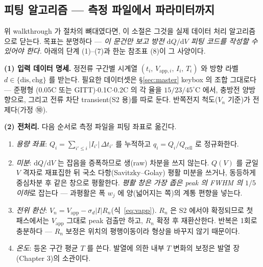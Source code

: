 \documentclass[11pt,a4paper]{article}
\newcommand{\dd}{\mathrm{d}}
\newcommand{\app}{\mathrm{app}}
\newcommand{\cell}{\mathrm{cell}}
\newcommand{\dis}{\mathrm{dis}}
\newcommand{\chg}{\mathrm{chg}}
\begin{document}
\subsection{피팅 알고리즘 — 측정 파일에서 파라미터까지}
위 walkthrough 가 절차의 뼈대였다면, 이 소절은 그것을 실제 데이터 처리 알고리즘으로 닫는다. 목표는 분명하다 —
\emph{이 문건만 보고 방전 $\dd Q/\dd V$ 피팅 코드를 작성할 수 있어야 한다.} 아래의 단계 (1)--(7)과 한눈 참조표 (8)이 그 사양이다.

\textbf{(1) 입력 데이터 명세.} 정전류 구간별 시계열 $(t_i,\,V_{\app,i},\,I_i,\,T_i)$ 와 방향 라벨
$d\in\{\dis,\chg\}$ 를 받는다. 필요한 데이터셋은 \S\ref{sec:master} keybox 의 조합 그대로다 — 준평형
(0.05C 또는 GITT)$\cdot$0.1C$\cdot$0.2C 의 각 율을 $15/23/45^\circ$C 에서, 충방전 양방향으로, 그리고 전류 차단
transient(S2 용)를 따로 둔다. 반쪽전지 척도($V_n$ 기준)가 전제다(가정 ⑩).

\textbf{(2) 전처리.} 다음 순서로 측정 파일을 피팅 좌표로 옮긴다.
\begin{enumerate}[label=(\roman*),leftmargin=2.0em,itemsep=1pt]
\item \emph{용량 좌표}: $Q_i=\sum_{i'\le i}|I_{i'}|\,\Delta t_{i'}$ 를 누적하고 $q_i=Q_i/Q_\cell$ 로 정규화한다.
\item \emph{미분}: $\dd Q/\dd V$ 는 잡음을 증폭하므로 생(raw) 차분을 쓰지 않는다. $Q(V)$ 를 균일 $V$ 격자로
  재표집한 뒤 국소 다항(Savitzky--Golay) 평활 미분을 쓰거나, 동등하게 중심차분 후 같은 창으로 평활한다.
  \emph{평활 창은 가장 좁은 peak 의 FWHM 의 $1/5$ 이하}로 잡는다 — 과평활은 폭 $w_j$ 에 양(넓어지는 쪽)의
  계통 편향을 넣는다.
\item \emph{전위 환산}: $V_n=V_\app-\sigma_d|I|R_n$(식~\eqref{eq:vapp}). $R_n$ 은 S2 에서야 확정되므로 첫
  패스에서는 $V_\app$ 그대로 peak 검출만 하고, $R_n$ 확정 후 재환산한다. 반복은 1회로 충분하다 — $R_n$ 보정은
  위치의 평행이동이라 형상을 바꾸지 않기 때문이다.
\item \emph{온도}: 등온 구간 평균 $T$ 를 쓴다. 발열에 의한 내부 $T$ 변화의 보정은 발열 장(Chapter 3)의 소관이다.
\end{enumerate}
\end{document}
